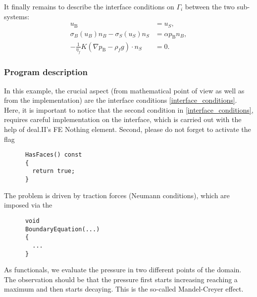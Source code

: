 It finally remains to describe the interface 
conditions on $\Gamma_{i}$ between the two sub-systems:
\begin{equation}
\label{interface_conditions}
\begin{aligned}
u_{\text{B}} &= u_S ,   \\
\sigma_{B}(u_B)n_B - \sigma_S(u_S)n_S &= 
\alpha p_{\text{B}} n_B  , \\
-\frac{1}{\eta_f} K(\nabla p_{\text{B}} - \rho_f g) \cdot n_S &= 0. 
\end{aligned} 
\end{equation}


\subsubsection{Program description}
In this example, the crucial aspect (from mathematical point of view 
as well as from the implementation) are the interface conditions
\eqref{interface_conditions}.
Here, it is important to notice that the second condition 
in \eqref{interface_conditions}, requires careful 
implementation on the interface, which is 
carried out with the help of deal.II's FE Nothing element.
Second, please do not forget to activate the flag
\begin{verbatim}
      HasFaces() const
      {
        return true;
      }
\end{verbatim}

The problem is driven by traction forces (Neumann conditions), which 
are imposed via the 
\begin{verbatim}
      void
      BoundaryEquation(...)
      {
        ...   
      }
\end{verbatim}

As functionals, we evaluate the pressure in two different 
points of the domain. The observation should be that the 
pressure first starts increasing reaching a maximum and then
starts decaying. This is the so-called Mandel-Creyer effect.
